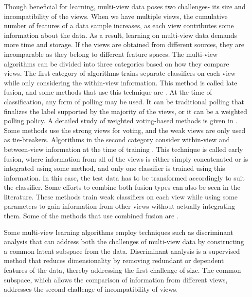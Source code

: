 Though beneficial for learning, multi-view data poses two challenges- its size and incompatibility of the views. When we have multiple views, the cumulative number of features of a data sample increases, as each view contributes some information about the data. As a result, learning on multi-view data demands more time and storage. If the views are obtained from different sources, they are incomparable as they belong to different feature spaces. The multi-view algorithms can be divided into three categories based on how they compare views. The first category of algorithms trains separate classifiers on each view while only considering the within-view information. This method is called late fusion, and some methods that use this technique are \cite{BrunoM09, KnoblockMM11}. At the time of classification, any form of polling may be used. It can be traditional polling that finalizes the label supported by the majority of the views, or it can be a weighted polling policy. A detailed study of weighted voting-based methods is given in \cite{WozniakJ09}. Some methods use the strong views for voting, and the weak views are only used as tie-breakers. Algorithms in the second category consider within-view and between-view information at the time of training \cite{DietheHS08, YuTLGSDM11, HouthuysLS18}. This technique is called early fusion, where information from all of the views is either simply concatenated or is integrated using some method, and only one classifier is trained using this information. In this case, the test data has to be transformed accordingly to suit the classifier. Some efforts to combine both fusion types can also be seen in the literature. These methods train weak classifiers on each view while using some parameters to gain information from other views without actually integrating them. Some of the methods that use combined fusion are \cite{HouthuysLS18, KoccoC11}.

Some multi-view learning algorithms \cite{KanSZLC16, SunXY15} employ techniques such as discriminant analysis that can address both the challenges of multi-view data by constructing a common latent subspace from the data. Discriminant analysis is a supervised method that reduces dimensionality by removing redundant or dependent features of the data, thereby addressing the first challenge of size. The common subspace, which allows the comparison of information from different views, addresses the second challenge of incompatibility of views.

